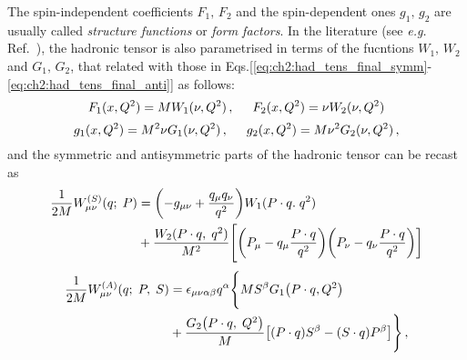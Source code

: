 The spin-independent coefficients $F_1,\, F_2$ and the spin-dependent ones $g_1,\,g_2$ are usually called \textit{structure functions} or \textit{form factors}. In the literature (see \textit{e.g.} Ref.~\cite{leader_2001,Anselmino:1994gn}), the hadronic tensor is also parametrised in terms of the fucntions $W_1 ,\, W_2$ and $G_1,\, G_2$, that related with those in Eqs.[\ref{eq:ch2:had_tens_final_symm}-\ref{eq:ch2:had_tens_final_anti}] as follows:
\begin{equation}
  F_1 (x, Q^2) = M W_1 (\nu, Q^2)\,, \hspace{5mm} F_2(x,Q^2) = \nu W_2 (\nu,Q^2)
\end{equation}
\begin{equation}
  g_1 (x, Q^2) = M^2 \nu G_1 (\nu, Q^2) \,, \hspace{5mm} g_2 (x, Q^2) = M \nu^2 G_2 (\nu, Q^2)\,,
\end{equation}
and the symmetric and antisymmetric parts of the hadronic tensor can be recast as
\begin{equation}
  \begin{split}
    \frac{1}{2M} W_{\mu \nu}^{(S)} (q; \; P) & = \qty(-g_{\mu \nu} + \frac{q_{\mu} q_{\nu}}{q^2}) W_1( P \cdot q. \; q^2) \\
    & + \frac{W_2 (P\cdot q,\; q^2)}{M^2} \Biggl[ \qty(P_{\mu} - q_{\mu} \frac{P \cdot q}{q^2}) \qty(P_{\nu} - q_{\nu} \frac{P \cdot q}{q^2}) \biggr]
  \end{split}
  \label{eq:ch2:had_tens_symm}
\end{equation}
\begin{equation}
  \begin{split}
    \frac{1}{2M} W_{\mu \nu}^{(A)} (q; \; P, \; S) & = \epsilon_{\mu \nu \alpha \beta} q^{\alpha} \Biggl\{ M S^{\beta} G_1 \qty(P\cdot q, Q^2) \Biggr.\\
    & +  \Biggl. \frac{G_2 \qty(P \cdot q,\;Q^2)}{M} \qty[ (P \cdot q) S^{\beta} - (S \cdot q) P^{\beta} ]\Biggr\} \,,
  \end{split}  
\end{equation}
